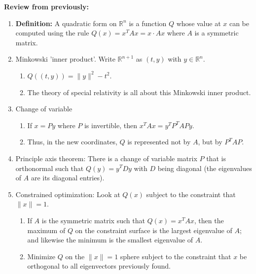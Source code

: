 \documentclass[12pt,letterpaper]{article}
\begin{document}
\thispagestyle{fancy}

\textbf{Review from previously:}
    \begin{enumerate}
    \setlength{\itemsep}{3em}
        \item \textbf{Definition:} A quadratic form on $\mathbb{R}^n$ is a function $Q$ whose value at $x$ can be computed using the rule $Q(x) = x^T A x = x \cdot A x$ where $A$ is a symmetric matrix.
        \item Minkowski 'inner product'. Write $\mathbb{R}^{n+1}$ as $(t, y)$ with $y \in \mathbb{R}^n$.
        \begin{enumerate}
            \item $Q((t, y)) = \|y\|^2 - t^2$.
            \item The theory of special relativity is all about this Minkowski inner product.
        \end{enumerate}
        \item Change of variable
        \begin{enumerate}
            \item If $x = Py$ where $P$ is invertible, then $x^T A x = y^T P^T A P y$.
            \item Thus, in the new coordinates, $Q$ is represented not by $A$, but by $P^T A P$.
        \end{enumerate}
        \item Principle axis theorem: There is a change of variable matrix $P$ that is orthonormal such that $Q(y) = y^T D y$ with $D$ being diagonal (the eigenvalues of $A$ are its diagonal entries).
        \item Constrained optimization: Look at $Q(x)$ subject to the constraint that $\|x\| = 1$.
        \begin{enumerate}
            \item If $A$ is the symmetric matrix such that $Q(x) = x^T A x$, then the maximum of $Q$ on the constraint surface is the largest eigenvalue of $A$; and likewise the minimum is the smallest eigenvalue of $A$.
            \item Minimize $Q$ on the $\|x\| = 1$ sphere subject to the constraint that $x$ be orthogonal to all eigenvectors previously found.
        \end{enumerate}
       \end{enumerate}
\newpage
\end{document}
